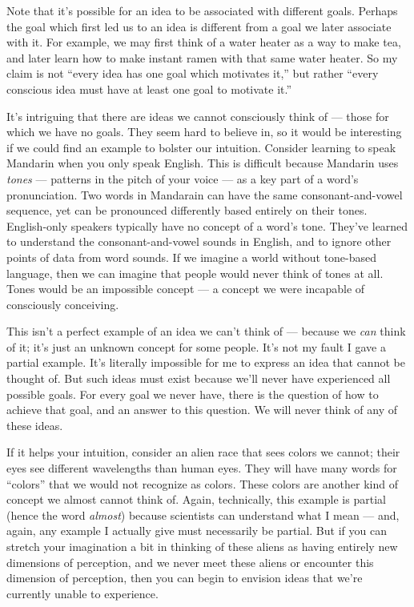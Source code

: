 \documentclass[11pt, oneside]{article}
\theoremstyle{argtstyle}
\begin{document}
Note that it's possible for an idea to be associated with different goals.
Perhaps the goal which first led us to an idea is
different from a goal we later associate with it. For example, we may first
think of a water heater as a way to make tea, and later learn how to make
instant ramen with that same water heater.
So my claim is not ``every idea has one goal which motivates it,'' but rather
``every conscious idea must have at least one goal to motivate it.''

It's intriguing that there are ideas we cannot consciously think of ---
those for
which we have no goals. They seem hard to believe in, so it would be
interesting if we could find an example to bolster our intuition.
Consider learning to speak Mandarin when you only speak English.
This is difficult because Mandarin uses {\em tones} --- patterns in the pitch of
your voice --- as a key part of a word's pronunciation.
Two words in Mandarain can have
the same consonant-and-vowel sequence, yet can be
pronounced differently based entirely on their tones.
English-only speakers typically have no concept of a word's tone.
They've learned to understand the consonant-and-vowel sounds in English, and to
ignore other points of data from word sounds. If we imagine a world without
tone-based language, then we can imagine that people would never think of
tones at all. Tones would be an impossible concept --- a concept we were
incapable of consciously conceiving.

This isn't a perfect example of an idea we can't think of --- because we {\em
can} think of it; it's just an unknown concept for some people.
It's not my fault I
gave a partial example.
It's literally impossible for me to express an idea that
cannot be thought of.
But such ideas must exist because we'll never
have experienced all possible goals.
For every goal we never have,
there is the question of how to achieve that goal, and an answer to this
question. We will never think of any of these ideas.

If it helps your intuition, consider an alien race that sees colors we cannot;
their eyes see different wavelengths than human eyes.
They will have many words for ``colors''
that we would not recognize as colors. These colors are another kind of concept
we almost cannot think of.
Again, technically, this example is
partial (hence the word {\em almost})
because scientists can understand what I mean --- and, again, any
example I actually give must necessarily be partial. But if you can stretch your
imagination a bit in thinking of these aliens as having entirely new dimensions
of perception, and we never meet these aliens or encounter this dimension of
perception, then you can begin to envision ideas that we're currently
unable to experience.
\end{document}
